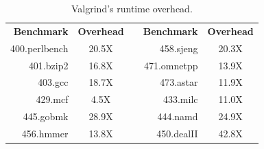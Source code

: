 \begin{table}[t]
	\centering
	\begin{tabular}{r|c p{0.1em} r|c}
		\textbf{Benchmark} & \textbf{Overhead} & & \textbf{Benchmark} & \textbf{Overhead} \\
		\cline{1-2} \cline{4-5}
		400.perlbench	& 20.5X	& & 458.sjeng	& 20.3X	\\
		401.bzip2		& 16.8X	& & 471.omnetpp	& 13.9X	\\
		403.gcc			& 18.7X	& & 473.astar	& 11.9X	\\
		429.mcf			& 4.5X 	& & 433.milc		& 11.0X	\\
		445.gobmk		& 28.9X	& & 444.namd		& 24.9X	\\
		456.hmmer		& 13.8X	& & 450.dealII	& 42.8X	\\
	\end{tabular}
	\caption{Valgrind's runtime overhead. \label{table:valgrind}}
\end{table}


